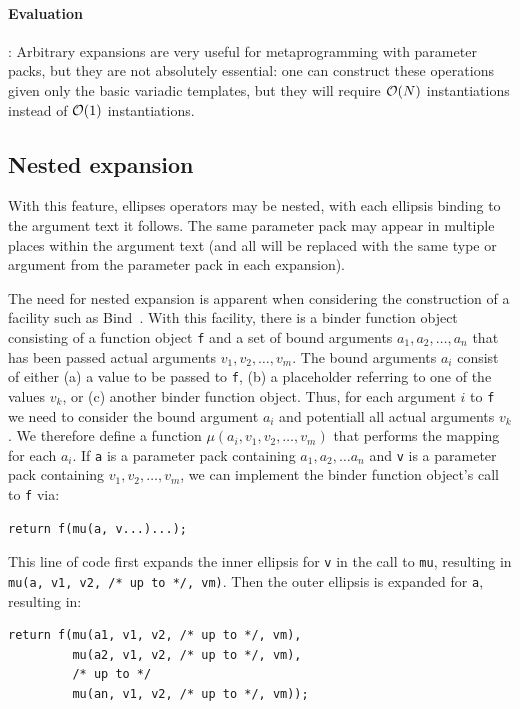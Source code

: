 \documentclass{article}
\begin{document}
\paragraph{Evaluation}: Arbitrary expansions are very useful for
metaprogramming with parameter packs, but they are not absolutely
essential: one can construct these operations given only the basic
variadic templates, but they will require ${\cal O}(N)$ instantiations
instead of ${\cal O}(1)$ instantiations.

\subsection{Nested expansion}
With this feature, ellipses operators may be nested, with each
ellipsis binding to the argument text it follows. The same parameter
pack may appear in multiple places within the argument text (and all
will be replaced with the same type or argument from the parameter
pack in each expansion). 

The need for nested expansion is apparent when considering the
construction of a facility such as Bind~\cite[\S
  3.3]{Austern04b}. With this facility, there is a binder function
object consisting of a function object \texttt{f} and a set of bound
arguments $a_1, a_2, \ldots, a_n$ that has been passed actual
arguments $v_1, v_2, \ldots, v_m$. The bound arguments $a_i$ consist
of either (a) a value to be passed to \texttt{f}, (b) a placeholder
referring to one of the values $v_k$, or (c) another binder function
object. Thus, for each argument $i$ to \texttt{f} we need to consider
the bound argument $a_i$ and potentiall all actual arguments $v_k$. We
therefore define a function $\mu(a_i, v_1, v_2, \ldots, v_m)$ that
performs the mapping for each $a_i$. If \texttt{a} is a parameter pack
containing $a_1, a_2, \ldots a_n$ and \texttt{v} is a parameter pack
containing $v_1, v_2, \ldots, v_m$, we can implement the binder
function object's call to \texttt{f} via:

\begin{verbatim}
return f(mu(a, v...)...);
\end{verbatim}

This line of code first expands the inner ellipsis for \texttt{v} in
the call to \texttt{mu}, resulting in \texttt{mu(a, v1, v2, /* up to
  */, vm)}. Then the outer ellipsis is expanded for \texttt{a},
resulting in:
\begin{verbatim}
return f(mu(a1, v1, v2, /* up to */, vm),
         mu(a2, v1, v2, /* up to */, vm),
         /* up to */
         mu(an, v1, v2, /* up to */, vm));
\end{verbatim}
\end{document}
